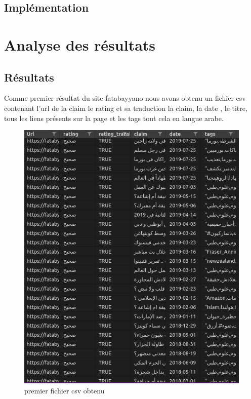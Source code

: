 \documentclass[oneside,13pt,a4paper]{report}
\begin{document}
\section{Implémentation}

\chapter{Analyse des résultats}

\section{Résultats}
Comme premier résultat du site fatabayyano nous avons obtenu un fichier csv contenant l'url de la claim le rating et sa traduction la claim, la date , le titre, tous les liens présents sur la page et les tags tout cela en langue arabe.
\begin{figure}[h]
	\centering
	\begin{minipage}[c]{.5\linewidth}
\includegraphics[width=1\textwidth]{img/fatab1.png}
\caption{premier fichier csv obtenu}
	\end{minipage}
\end{figure}
\end{document}
